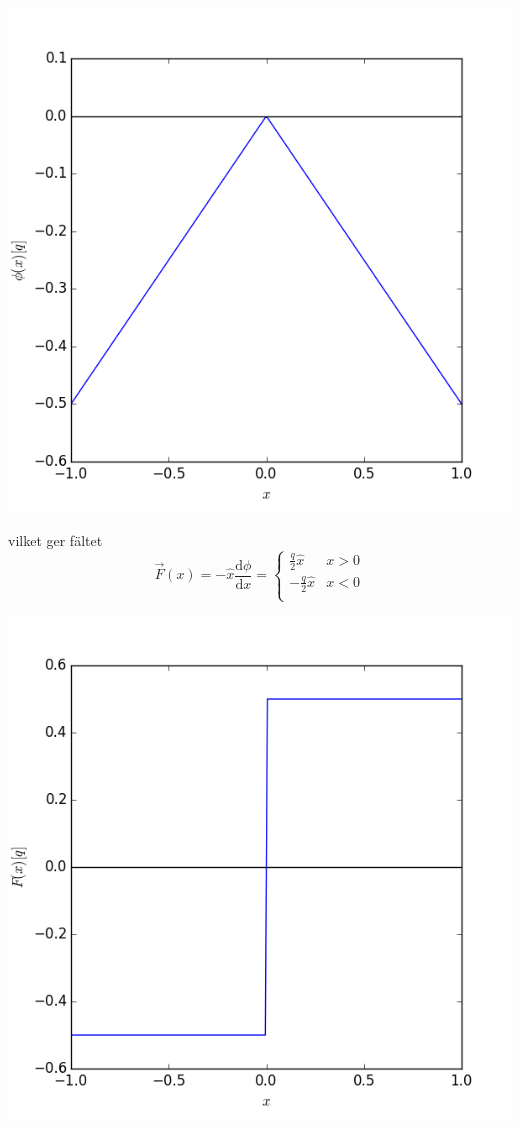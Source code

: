 \documentclass[%
oneside,                 %
final,                   %
10pt]{article}
\begin{document}
\centerline{\includegraphics[width=0.7\linewidth]{fig/pointcharge_pot_1dim.png}}

\vspace{6mm}



vilket ger fältet
\begin{equation}
\vec{F}(x) = -\hat{x} \frac{\mbox{d}\phi}{\mbox{d}x} = 
\left\{
\begin{array}{ll}
\frac{q}{2} \hat{x} & x > 0 \\ 
-\frac{q}{2} \hat{x} & x < 0 \\ 
\end{array}
\right.
\end{equation}



\vspace{6mm}

\centerline{\includegraphics[width=0.7\linewidth]{fig/pointcharge_field_1dim.png}}
\end{document}
